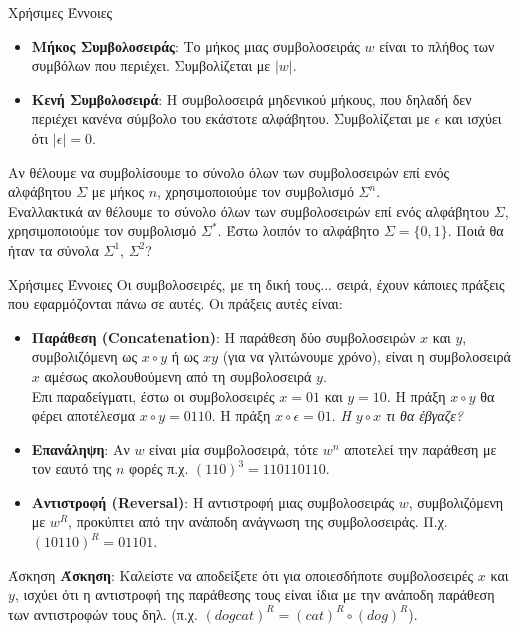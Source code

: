 \documentclass[size=14pt, paper=smartboard, style=fyma, mode=present]{powerdot}
\begin{document}
\begin{slide}[toc=]{Χρήσιμες Έννοιες}
\large 
{	\begin{itemize}
		\item \textbf{Μήκος Συμβολοσειράς}: Το μήκος μιας συμβολοσειράς $w$ είναι το πλήθος των συμβόλων που περιέχει. Συμβολίζεται με $|w|$. \pause
		\item \textbf{Κενή Συμβολοσειρά}: Η συμβολοσειρά μηδενικού μήκους, που δηλαδή δεν περιέχει κανένα σύμβολο του εκάστοτε αλφάβητου. Συμβολίζεται με $\epsilon$ και ισχύει ότι $|\epsilon|=0$.
	\end{itemize}}
	Αν θέλουμε να συμβολίσουμε το σύνολο όλων των συμβολοσειρών επί ενός αλφάβητου $\Sigma$ με μήκος $n$, χρησιμοποιούμε τον συμβολισμό $\Sigma^n$.   
	\\ Εναλλακτικά αν θέλουμε το σύνολο όλων των συμβολοσειρών επί ενός αλφάβητου $\Sigma$, χρησιμοποιούμε τον συμβολισμό $\Sigma^*$.
	\newline
	Έστω λοιπόν το αλφάβητο $\Sigma=\{0,1\}$. Ποιά θα ήταν τα σύνολα $\Sigma^1$, $\Sigma^2$?
\end{slide}
\begin{slide}[toc=]{Χρήσιμες Έννοιες} Οι συμβολοσειρές, με τη δική τους... σειρά, έχουν κάποιες πράξεις που εφαρμόζονται πάνω σε αυτές. Οι πράξεις αυτές είναι:
	\large
{	\begin{itemize}
		\item \textbf{Παράθεση (\textlatin{Concatenation})}: Η παράθεση δύο συμβολοσειρών $x$ και $y$, συμβολιζόμενη ως $x \circ y$ ή ως $xy$ (για να γλιτώνουμε χρόνο), είναι η συμβολοσειρά $x$ αμέσως ακολουθούμενη από τη συμβολοσειρά $y$. \\
		Επι παραδείγματι, έστω οι συμβολοσειρές $x=01$ και $y=10$. Η πράξη $x \circ y$ θα φέρει αποτέλεσμα $x \circ y = 0110$. Η πράξη $ x \circ \epsilon = 01$. \textit{Η $y \circ x$ τι θα έβγαζε?}
		\pause
		\item \textbf{Επανάληψη}: Αν $w$ είναι μία συμβολοσειρά, τότε $w^n$ αποτελεί την παράθεση με τον εαυτό της $n$ φορές π.χ. $(110)^3=110110110$.
		\pause
		\item \textbf{Αντιστροφή (\textlatin{Reversal})}: Η αντιστροφή μιας συμβολοσειράς $w$, συμβολιζόμενη με $w^R$, προκύπτει από την ανάποδη ανάγνωση της συμβολοσειράς. Π.χ. $(10110)^R=01101$. 
	\end{itemize}}
\end{slide}
\begin{slide}[toc=]{Άσκηση}
{\large \textbf{Άσκηση}: Καλείστε να αποδείξετε ότι για οποιεσδήποτε συμβολοσειρές $x$ και $y$, ισχύει ότι η αντιστροφή της παράθεσης τους είναι ίδια με την ανάποδη παράθεση των αντιστροφών τους δηλ.  \unboldmath (π.χ. $(dogcat)^R = (cat)^R \circ (dog)^R$).}
\end{slide}
\end{document}
